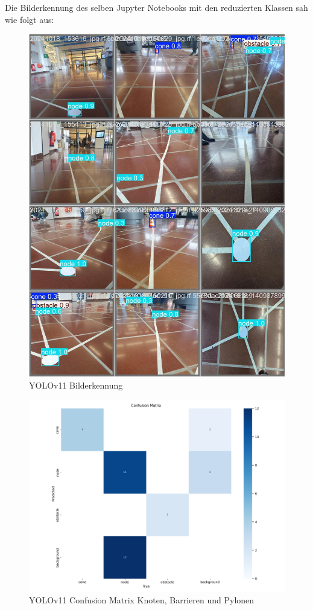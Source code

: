 Die Bilderkennung des selben Jupyter Notebooks mit den reduzierten Klassen sah wie folgt aus:

\begin{figure}[H]
\centering
\includegraphics[width=\textwidth -30mm]{assets/informatik-prototyp/yolo/recognized-images.jpeg}
\caption{YOLOv11 Bilderkennung}
\label{fig:img-recognition-yolo}
\end{figure}

\begin{figure}[H]
\centering
\includegraphics[width=\textwidth -20mm]{assets/informatik-prototyp/yolo/conf-matrix.png}
\caption{YOLOv11 Confusion Matrix Knoten, Barrieren und Pylonen}
\label{fig:conf-matrix-yolo}
\end{figure}

